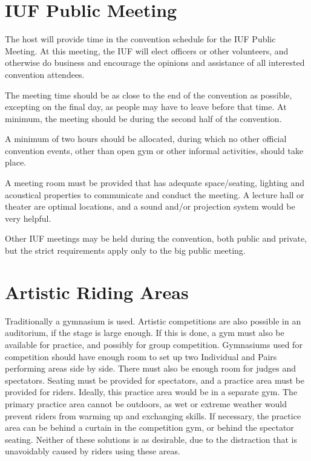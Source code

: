 \section{IUF Public Meeting}
The host will provide time in the convention schedule for the IUF Public Meeting.
At this meeting, the IUF will elect officers or other volunteers, and otherwise do business and encourage the opinions and assistance of all interested convention attendees.

The meeting time should be as close to the end of the convention as possible, excepting on the final day, as people may have to leave before that time.
At minimum, the meeting should be during the second half of the convention.

A minimum of two hours should be allocated, during which no other official convention events, other than open gym or other informal activities, should take place.

A meeting room must be provided that has adequate space/seating, lighting and acoustical properties to communicate and conduct the meeting.
A lecture hall or theater are optimal locations, and a sound and/or projection system would be very helpful.

Other IUF meetings may be held during the convention, both public and private, but the strict requirements apply only to the big public meeting.

\section{Artistic Riding Areas}
Traditionally a gymnasium is used.
Artistic competitions are also possible in an auditorium, if the stage is large enough.
If this is done, a gym must also be available for practice, and possibly for group competition.
Gymnasiums used for competition should have enough room to set up two Individual and Pairs performing areas side by side.
There must also be enough room for judges and spectators.
Seating must be provided for spectators, and a practice area must be provided for riders.
Ideally, this practice area would be in a separate gym.
The primary practice area cannot be outdoors, as wet or extreme weather would prevent riders from warming up and exchanging skills.
If necessary, the practice area can be behind a curtain in the competition gym, or behind the spectator seating.
Neither of these solutions is as desirable, due to the distraction that is unavoidably caused by riders using these areas.

